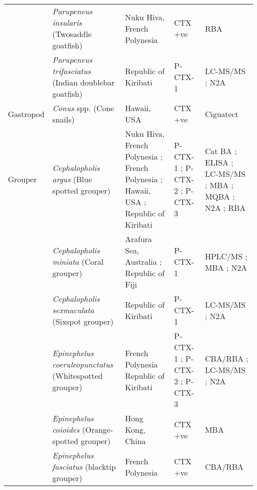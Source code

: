 \documentclass[12pt]{article}
\begin{document}
\begin{longtable}{ | p{2cm} | p{3cm} | p{4.5cm} | p{2cm} | p{3cm} | }
	& \emph{Parupeneus insularis} (Twosaddle goatfish) & Nuku Hiva, French Polynesia \cite{darius2007ciguatera} & CTX +ve \cite{darius2007ciguatera} & RBA \cite{darius2007ciguatera} \\
		& \emph{Parupeneus trifasciatus} (Indian doublebar goatfish) & Republic of Kiribati \cite{mak2013pacific} & P-CTX-1 \cite{mak2013pacific} & LC-MS/MS \cite{mak2013pacific}; N2A \cite{mak2013pacific} \\
	\hline
	Gastropod & \emph{Conus} spp. (Cone snails) & Hawaii, USA \cite{park2000microbial} & CTX +ve \cite{park2000microbial} & Ciguatect \textregistered \cite{park2000microbial} \\
	\hline
	Grouper & \emph{Cephalopholis argus} (Blue spotted grouper) & Nuku Hiva, French Polynesia \cite{darius2007ciguatera}; French Polynesia \cite{bagnis1987use}; Hawaii, USA \cite{campora2008detection}; Republic of Kiribati \cite{mak2013pacific} & P-CTX-1 \cite{mak2013pacific}; P-CTX-2 \cite{mak2013pacific}; P-CTX-3 \cite{mak2013pacific} & Cat BA \cite{bagnis1987use}; ELISA \cite{campora2008detection}; LC-MS/MS \cite{mak2013pacific}; MBA \cite{bagnis1987use}; MQBA \cite{bagnis1987use}; N2A \cite{campora2008detection,mak2013pacific}; RBA \cite{darius2007ciguatera} \\
	& \emph{Cephalopholis miniata} (Coral grouper) & Arafura Sea, Australia \cite{lucas1997pacific}; Republic of Fiji \cite{arnett2007ciguatera,dickey2008ciguatera} & P-CTX-1 \cite{arnett2007ciguatera,lucas1997pacific,dickey2008ciguatera} & HPLC/MS \cite{lucas1997pacific}; MBA \cite{lucas1997pacific}; N2A \cite{arnett2007ciguatera,dickey2008ciguatera} \\
	& \emph{Cephalopholis sexmaculata} (Sixspot grouper) & Republic of Kiribati \cite{mak2013pacific} & P-CTX-1 \cite{mak2013pacific} & LC-MS/MS \cite{mak2013pacific}; N2A \cite{mak2013pacific} \\
	& \emph{Epinephelus coeruleopunctatus} (Whitespotted grouper) & French Polynesia \cite{chinain2014mail} Republic of Kiribati \cite{mak2013pacific} & P-CTX-1 \cite{mak2013pacific}; P-CTX-2 \cite{mak2013pacific}; P-CTX-3 \cite{mak2013pacific} & CBA/RBA \cite{chinain2014mail}; LC-MS/MS \cite{mak2013pacific}; N2A \cite{mak2013pacific} \\
	& \emph{Epinephelus coioides} (Orange-spotted grouper) & Hong Kong, China \cite{wong2005study} & CTX +ve \cite{wong2005study} & MBA \cite{wong2005study} \\
	& \emph{Epinephelus fasciatus} (blacktip grouper) & French Polynesia \cite{chinain2014mail} & CTX +ve \cite{chinain2014mail} & CBA/RBA \cite{chinain2014mail} \\

\end{longtable}
\end{document}
